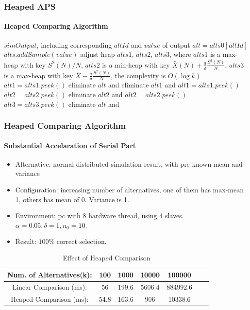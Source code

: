 \documentclass{beamer}
\begin{document}
\begin{frame}
\frametitle{Heaped APS}
\framesubtitle{Heaped Comparing Algorithm}
\begin{algorithmic}[1]
\tiny
{
\Require $simOutput$, including corresponding $altId$ and $value$ of output
\State $alt = alts0[altId]$ 
  \State \Return
\EndIf
\State $alts.addSample(value)$ 
\State adjust heap $alts1$, $alts2$, $alts3$, where $alts1$ is a max-heap with key $S^2(N)/N$, $alts2$ is a min-heap with key $\bar{X}(N) + \frac{a}{\delta}\frac{S^2(N)}{N}$, $alts3$ is a max-heap with key $\bar{X} - \frac{a}{\delta}\frac{S^2(N)}{N}$, the complexity is $O(\log k)$
\State $alt1 = alts1.peek()$
    \State eliminate $alt$ and \Return {}
  \Else
    \State eliminate $alt1$ and $alt1 = alts1.peek()$ 
  \EndIf
\EndWhile
\State $alt2 = alts2.peek()$
  \State eliminate $alt2$ and $alt2 = alts2.peek()$ 
\EndWhile
\State $alt3 = alts3.peek()$
  \State eliminate $alt$ and \Return {}
\EndIf
}
\end{algorithmic}
\end{frame}

\begin{frame}
\frametitle{Heaped Comparing Algorithm}
\framesubtitle{Substantial Accelaration of Serial Part}
\begin{itemize}
\item {Alternative: } normal distributed simulation result, with pre-known mean and variance
\item {Configuration: } increasing number of alternatives, one of them has max-mean 1, others has mean of 0. Variance is 1.
\item {Environment: } pc with 8 hardware thread, using 4 slaves. $\alpha=0.05, \delta=1, n_0 = 10$.
\item {Result: } $100\%$ correct selection.
\end{itemize}
\begin{table}[ht]
\begin{center}
\begin{tabular}{|c|c|c|c|c|c|c|}
\hline
Num. of Alternatives(k): & 100 & 1000 & 10000 & 100000 \\
\hline
Linear Comparison (ms): & 56 & 199.6 & 5606.4 & 884992.6 \\
\hline
Heaped Comparison (ms): & 54.8 & 163.6 & 906 & 10338.6 \\
\hline
\end{tabular} \\
\caption{Effect of Heaped Comparison}
\end{center}
\end{table}
\end{frame}
\end{document}
